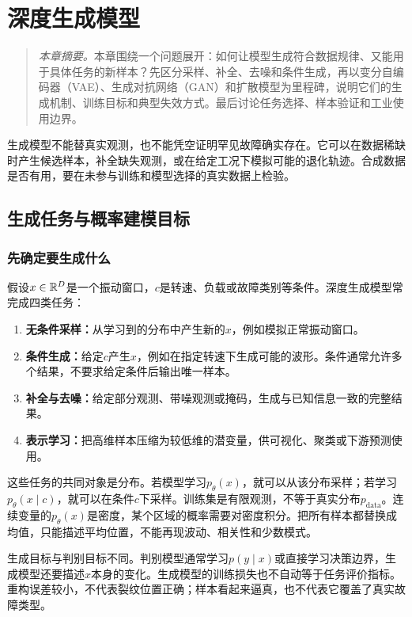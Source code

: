 \chapter{深度生成模型}
\begin{quote}\small
\textit{本章摘要。}本章围绕一个问题展开：如何让模型生成符合数据规律、又能用于具体任务的新样本？先区分采样、补全、去噪和条件生成，再以变分自编码器（VAE）、生成对抗网络（GAN）和扩散模型为里程碑，说明它们的生成机制、训练目标和典型失效方式。最后讨论任务选择、样本验证和工业使用边界。
\end{quote}

生成模型不能替真实观测，也不能凭空证明罕见故障确实存在。它可以在数据稀缺时产生候选样本，补全缺失观测，或在给定工况下模拟可能的退化轨迹。合成数据是否有用，要在未参与训练和模型选择的真实数据上检验。

\section{生成任务与概率建模目标}

\subsection{先确定要生成什么}

假设$x\in\mathbb{R}^D$是一个振动窗口，$c$是转速、负载或故障类别等条件。深度生成模型常完成四类任务：
\begin{enumerate}
  \item \textbf{无条件采样：}从学习到的分布中产生新的$x$，例如模拟正常振动窗口。
  \item \textbf{条件生成：}给定$c$产生$x$，例如在指定转速下生成可能的波形。条件通常允许多个结果，不要求给定条件后输出唯一样本。
  \item \textbf{补全与去噪：}给定部分观测、带噪观测或掩码，生成与已知信息一致的完整结果。
  \item \textbf{表示学习：}把高维样本压缩为较低维的潜变量，供可视化、聚类或下游预测使用。
\end{enumerate}

这些任务的共同对象是分布。若模型学习$p_{\theta}(x)$，就可以从该分布采样；若学习$p_{\theta}(x\mid c)$，就可以在条件$c$下采样。训练集是有限观测，不等于真实分布$p_{\mathrm{data}}$。连续变量的$p_{\theta}(x)$是密度，某个区域的概率需要对密度积分。把所有样本都替换成均值，只能描述平均位置，不能再现波动、相关性和少数模式。

生成目标与判别目标不同。判别模型通常学习$p(y\mid x)$或直接学习决策边界，生成模型还要描述$x$本身的变化。生成模型的训练损失也不自动等于任务评价指标。重构误差较小，不代表裂纹位置正确；样本看起来逼真，也不代表它覆盖了真实故障类型。

